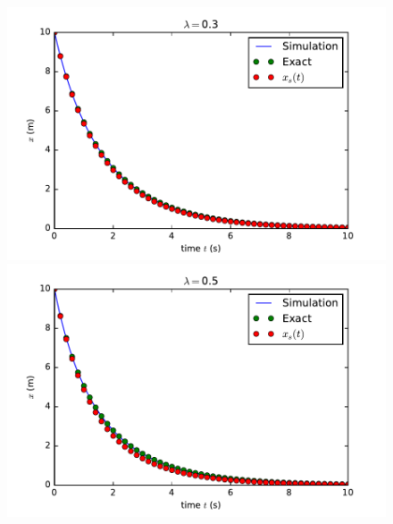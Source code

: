 \documentclass[a4paper,10pt]{article}
\begin{document}
\begin{figure}[!hp]
\hspace*{-2.1cm}\includegraphics[width=4.5in]{Simus_lambda=03.pdf}\hspace*{-1.1cm}\includegraphics[width=4.5in]{Simus_lambda=05.pdf}\\

\end{figure}
\end{document}
